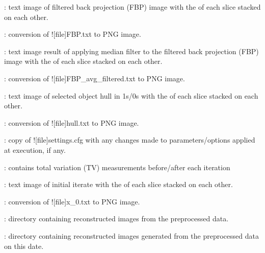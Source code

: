 \begin{tcbenvironment}
\begin{tcbparagraph}
\begin{ThinEnum}
\begin{ThinEnum}
\begin{ThinEnum}
\begin{ThinEnum}
\begin{ThinEnum}
\begin{ThinEnum}
\begin{ThinEnum}
\begin{ThinEnum}
\begin{ThinEnum}
                                        	\item {} : text image of filtered back projection (FBP) image with the \xyplane* of each slice stacked on each other.
                                        	\item {} : conversion of \docentry![file]{FBP.txt} to PNG image.
                                        	\item {} : text image result of applying median filter to the filtered back projection (FBP) image with the \xyplane* of each slice stacked on each other.
                                        	\item {} : conversion of \docentry![file]{FBP\_avg\_filtered.txt} to PNG image.
                                        	\item {} : text image of selected object hull in 1s/0s with the \xyplane* of each slice stacked on each other.
                                        	\item {} : conversion of \docentry![file]{hull.txt} to PNG image.
                                        	\item {} : copy of \docentry![file]{settings.cfg} with any changes made to parameters/options applied at execution, if any.
                                        	\item {} : contains total variation (TV) measurements before/after each iteration
                                        	\item {} : text image of initial iterate with the \xyplane* of each slice stacked on each other.
                                        	\item {} : conversion of \docentry![file]{x\_0.txt} to PNG image.
                                        \item {} : directory containing reconstructed images from the preprocessed data.
                                        \begin{ThinEnum}
                                            \item {} : directory containing reconstructed images generated from the preprocessed data on this date.
                                                \begin{ThinEnum}

\end{ThinEnum}
\end{ThinEnum}
\end{ThinEnum}
\end{ThinEnum}
\end{ThinEnum}
\end{ThinEnum}
\end{ThinEnum}
\end{ThinEnum}
\end{ThinEnum}
\end{ThinEnum}
\end{ThinEnum}
\end{tcbparagraph}
\end{tcbenvironment}

